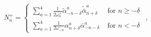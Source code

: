 \begin{equation}
N^+_n = \left\{  \begin{array}{ll} 
\sum_{a=1}^4 \frac{1}{2\omega^+_{n}} 
\tilde{\alpha}_{-n-\delta}^a \tilde{\bar{\alpha}}_{n+\delta}^a 
& \mbox{ for } n \geq -\delta \\
\sum_{a=1}^4 \frac{1}{2\omega^-_{-n}} 
\alpha_{n+\delta}^a \bar{\alpha}_{-n-\delta}^a 
& \mbox{ for } n < -\delta
\end{array} \right. \ \ ,
\end{equation}

